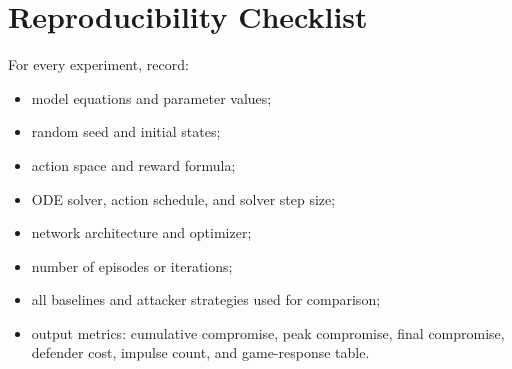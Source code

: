 \documentclass[11pt,a4paper]{article}
\begin{document}
\section{Reproducibility Checklist}
For every experiment, record:
\begin{itemize}
\item model equations and parameter values;
\item random seed and initial states;
\item action space and reward formula;
\item ODE solver, action schedule, and solver step size;
\item network architecture and optimizer;
\item number of episodes or iterations;
\item all baselines and attacker strategies used for comparison;
\item output metrics: cumulative compromise, peak compromise, final compromise, defender cost, impulse count, and game-response table.
\end{itemize}
\end{document}
